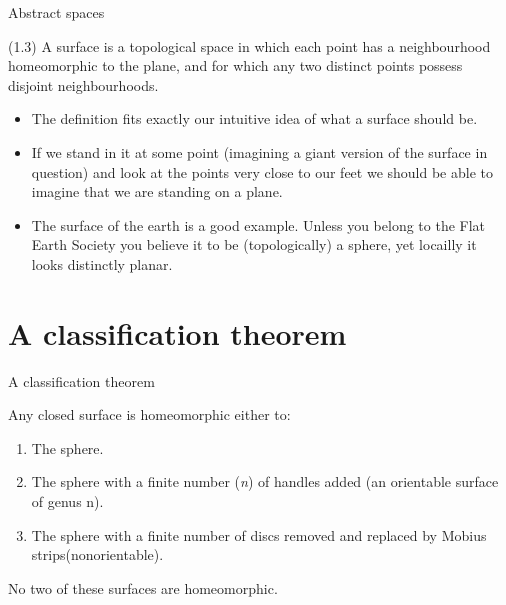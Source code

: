 \documentclass{beamer}
\begin{document}
\begin{frame}{Abstract spaces}
  \begin{definition}[Surface]
    (1.3) A surface is a topological space in which each point has a neighbourhood homeomorphic to the plane, and for which any two distinct points possess disjoint neighbourhoods.
    \begin{itemize}
    \item The definition fits exactly our intuitive idea of what a surface should be.
    \item If we stand in it at some point (imagining a giant version of the surface in question) and look at the points very close to our feet we should be able to imagine that we are standing on a plane.
    \item The surface of the earth is a good example. Unless you belong to the Flat Earth Society you believe it to be (topologically) a sphere, yet locailly it looks distinctly planar.
    \end{itemize}
  \end{definition}
\end{frame}

\section{A classification theorem}

\begin{frame}{A classification theorem}
  \begin{theorem}
    Any closed surface is homeomorphic either to:
    \begin{enumerate}[label={(\alph*)}]
    \item The sphere.
    \item The sphere with a finite number (\textsl{n}) of handles added (an orientable surface of genus n).
    \item The sphere with a finite number of discs removed and replaced by Mobius strips(nonorientable).
    \end{enumerate}
    No two of these surfaces are homeomorphic.
  \end{theorem}
\end{frame}
\end{document}
